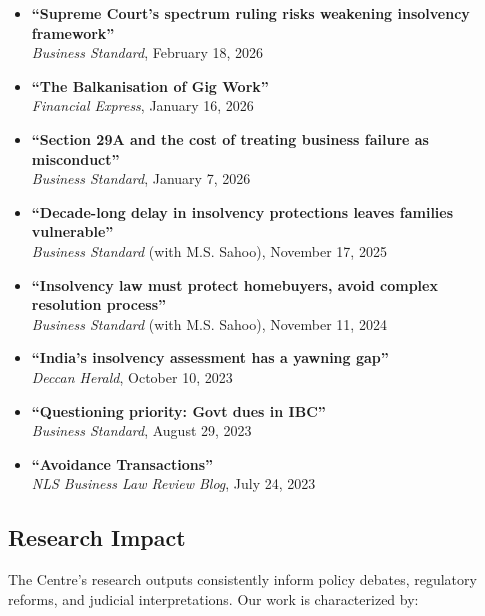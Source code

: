 \documentclass[11pt,a4paper]{article}
\begin{document}
\begin{itemize}[leftmargin=*,itemsep=0.3cm]
    \item \textbf{``Supreme Court's spectrum ruling risks weakening insolvency framework''} \\
    \textit{Business Standard}, February 18, 2026

    \item \textbf{``The Balkanisation of Gig Work''} \\
    \textit{Financial Express}, January 16, 2026

    \item \textbf{``Section 29A and the cost of treating business failure as misconduct''} \\
    \textit{Business Standard}, January 7, 2026

    \item \textbf{``Decade-long delay in insolvency protections leaves families vulnerable''} \\
    \textit{Business Standard} (with M.S. Sahoo), November 17, 2025

    \item \textbf{``Insolvency law must protect homebuyers, avoid complex resolution process''} \\
    \textit{Business Standard} (with M.S. Sahoo), November 11, 2024

    \item \textbf{``India's insolvency assessment has a yawning gap''} \\
    \textit{Deccan Herald}, October 10, 2023

    \item \textbf{``Questioning priority: Govt dues in IBC''} \\
    \textit{Business Standard}, August 29, 2023

    \item \textbf{``Avoidance Transactions''} \\
    \textit{NLS Business Law Review Blog}, July 24, 2023
\end{itemize}

\vspace{0.5cm}

\subsection*{Research Impact}

The Centre's research outputs consistently inform policy debates, regulatory reforms, and judicial interpretations. Our work is characterized by:
\end{document}
